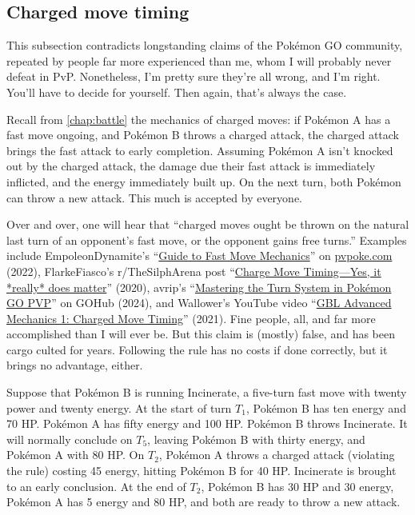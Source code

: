 \subsection{Charged move timing\label{subsec:cmt}}
\begin{tipbox}[title=Warning! Achtung! \begin{chinese}危险！\end{chinese} ¡Peligro! \begin{japanese}危険!\end{japanese} \textit{Tulaga faigata!}]
This subsection contradicts longstanding claims of the Pokémon GO community, repeated by
  people far more experienced than me, whom I will probably never defeat in PvP.
Nonetheless, I'm pretty sure they're all wrong, and I'm right.
You'll have to decide for yourself.
Then again, that's always the case.
\end{tipbox}
Recall from \autoref{chap:battle} the mechanics of charged moves: if Pokémon A has a fast move ongoing,
 and Pokémon B throws a charged attack, the charged attack brings the fast attack to early completion.
Assuming Pokémon A isn't knocked out by the charged attack, the damage due their fast attack is
 immediately inflicted, and the energy immediately built up.
On the next turn, both Pokémon can throw a new attack.
This much is accepted by everyone.

Over and over, one will hear that ``charged moves ought be thrown on the natural last turn of an
 opponent's fast move, or the opponent gains free turns.''
Examples include EmpoleonDynamite's ``\href{https://pvpoke.com/articles/strategy/guide-to-fast-move-registration/}{Guide to Fast Move Mechanics}''
 on \href{https://pvpoke.com}{pvpoke.com} (2022), FlarkeFiasco's r/TheSilphArena post ``\href{reddit.com/r/TheSilphArena/comments/fvu62a/charge\_move\_timing\_yes\_it\_really\_does\_matter/}{Charge Move Timing---Yes, it *really* does matter}'' (2020),
 avrip's ``\href{https://pokemongohub.net/post/pvp/mastering-the-turn-system-in-pokemon-go-pvp/}{Mastering the Turn System in Pokémon GO PVP}'' on GOHub (2024),
 and Wallower's YouTube video ``\href{https://www.youtube.com/watch?v=pAtCo8xg700}{GBL Advanced Mechanics 1: Charged Move Timing}'' (2021).
Fine people, all, and far more accomplished than I will ever be.
But this claim is (mostly) false, and has been cargo culted for years.
Following the rule has no costs if done correctly, but it brings no advantage, either.

Suppose that Pokémon B is running Incinerate, a five-turn fast move with twenty power and twenty energy.
At the start of turn $T_1$, Pokémon B has ten energy and 70 HP\@.
Pokémon A has fifty energy and 100 HP\@.
Pokémon B throws Incinerate.
It will normally conclude on $T_5$, leaving Pokémon B with thirty energy, and Pokémon A with 80 HP\@.
On $T_2$, Pokémon A throws a charged attack (violating the rule) costing 45 energy, hitting Pokémon B for 40 HP\@.
Incinerate is brought to an early conclusion.
At the end of $T_2$, Pokémon B has 30 HP and 30 energy, Pokémon A has 5 energy and 80 HP, and both are ready to throw a new attack.

